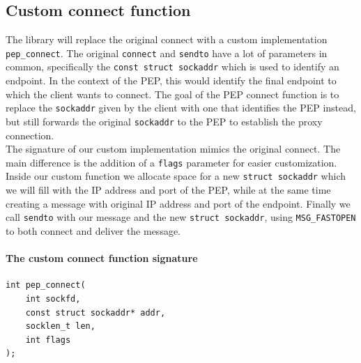 \documentclass[a4paper,english, 12pt]{report}
\begin{document}
\subsection{Custom connect function}
The library will replace the original connect with a custom implementation \verb|pep_connect|. The original \verb|connect| and \verb|sendto| have a lot of parameters in common, specifically the \verb|const struct sockaddr| which is used to identify an endpoint. In the context of the PEP, this would identify the final endpoint to which the client wants to connect. The goal of the PEP connect function is to replace the \verb|sockaddr| given by the client with one that identifies the PEP instead, but still forwards the original \verb|sockaddr| to the PEP to establish the proxy connection.\\

The signature of our custom implementation mimics the original connect. The main difference is the addition of a \verb|flags| parameter for easier customization. Inside our custom function we allocate space for a new \verb|struct sockaddr| which we will fill with the IP address and port of the PEP, while at the same time creating a message with original IP address and port of the endpoint. Finally we call \verb|sendto| with our message and the new \verb|struct sockaddr|, using \verb|MSG_FASTOPEN| to both connect and deliver the message.\\

\noindent\begin{minipage}{\linewidth}
\paragraph{The custom connect function signature}
\begin{verbatim}
int pep_connect(
    int sockfd,
    const struct sockaddr* addr,
    socklen_t len,
    int flags
);
\end{verbatim}
\end{minipage}


%
%    
%
%    
%
\end{document}
